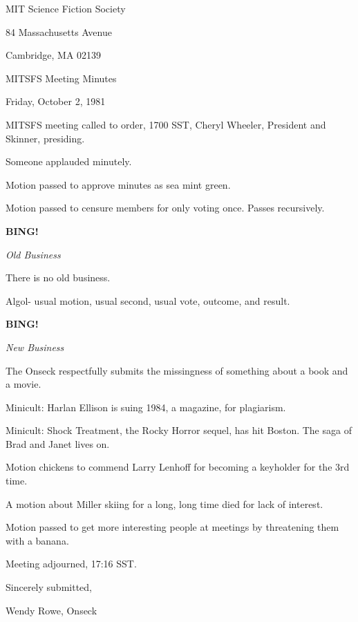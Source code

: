 \documentclass[12pt]{article}
\newcommand{\bing}{{\bf BING!} }
\newcommand{\goto}[1]{\bing \vskip 12pt \centerline{{\em{#1}}}}
\begin{document}
\begin{center}

MIT Science Fiction Society 

84 Massachusetts Avenue

Cambridge, MA 02139

\vspace{12pt}

MITSFS Meeting Minutes 

Friday, October 2, 1981

\end{center}
 
\vspace{18pt}

\setlength{\parskip}{6pt}

\noindent
MITSFS meeting called to order, 1700 SST,
Cheryl Wheeler, President and Skinner, presiding.

Someone applauded minutely.

Motion passed to approve minutes as sea mint green.

Motion passed to censure members for only voting once. Passes recursively.

\goto{Old Business}

There is no old business.

Algol- usual motion, usual second, usual vote, outcome, and result.

\goto{New Business}

The Onseck respectfully submits the missingness of something about a book and a movie.

Minicult: Harlan Ellison is suing 1984, a magazine, for plagiarism.

Minicult: Shock Treatment, the Rocky Horror sequel, has hit Boston. The saga of Brad and Janet lives on.

Motion chickens to commend Larry Lenhoff for becoming a keyholder for the 3rd time.

A motion about Miller skiing for a long, long time died for lack of interest.

Motion passed to get more interesting people at meetings by threatening them with a banana.

\vspace{12pt}

\noindent
Meeting adjourned, 17:16 SST.

\vspace{18pt}

\centerline{Sincerely submitted,}
\centerline{Wendy Rowe, Onseck}
\end{document}
